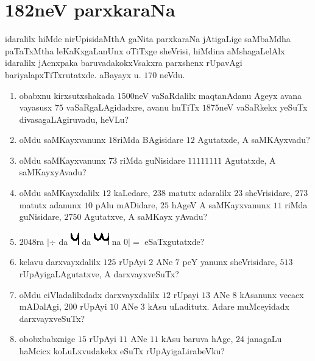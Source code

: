 \chapter{182neV parxkaraNa}



idaralilx hiMde nirUpisidaMthA gaNita parxkaraNa jAtigaLige saMbaMdha
paTaTxMtha leKaKxgaLanUnx oTiTxge sheVrisi, hiMdina aMshagaLelAlx
idaralilx jAcnxpaka baruvadakokxVsakxra parxshenx rUpavAgi
bariyalapxTiTxrutatxde. aBayayx u. $170$ neVdu.

\begin{enumerate}
\renewcommand{\theenumi}{\arabic{enumi}}
\renewcommand{\labelenumi}{\rm(\theenumi)}
\item obabxnu kirxsutxshakada $1500$neV vaSaRdalilx maqtanAdanu
Ageyx avana vayasusx $75$ vaSaRgaLAgidadxre, avanu huTiTx $1875$neV
vaSaRkekx yeSuTx divasagaLAgiruvadu, heVLu?

\item oMdu saMKayxvanunx $18$riMda BAgisidare $12$ Agutatxde, A
saMKAyxvadu?

\item oMdu saMKayxvanunx $73$ riMda guNisidare $11111111$ Agutatxde, A
saMKayxyAvadu? 

\item oMdu saMKayxdalilx $12$ kaLedare, $238$ matutx adaralilx $23$
sheVrisidare, $273$ matutx adanunx $10$ pAlu mADidare, $25$ hAgeV A
saMKayxvanunx $11$ riMda guNisidare, $2750$ Agutatxve, A saMKayx
yAvadu? 
\item $2048$ra $|\div$ da \includegraphics{images/u.eps}
da \includegraphics{images/mu.eps} na $0|=$ eSaTxgutatxde?

\item kelavu darxvayxdalilx $125$ rUpAyi $2$ ANe $7$ peY yanunx
sheVrisidare, $513$  rUpAyigaLAgutatxve, A darxvayxveSuTx?

\item oMdu ciVladalilxdadx darxvayxdalilx $12$ rUpayi $13$ ANe $8$
kAsanunx vecacx mADalAgi, $200$ rUpAyi $10$ ANe $3$ kAsu
uLaditutx. Adare muMceyidadx darxvayxveSuTx?

\item obobxbabxnige $15$ rUpAyi $11$ ANe $11$ kAsu baruva hAge, $24$
janagaLu haMcicx koLuLxvudakekx eSuTx rUpAyigaLirabeVku?


\end{enumerate}

